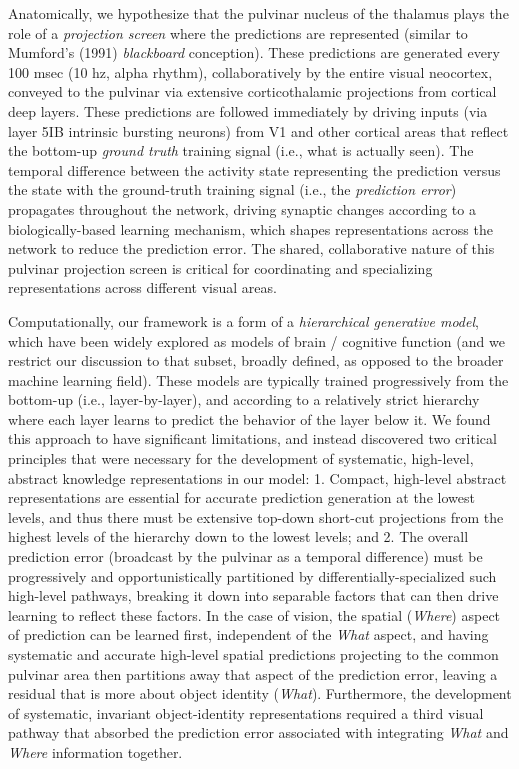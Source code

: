 \documentclass[11pt,twoside]{article}
\newif\myifpdf
\begin{document}
Anatomically, we hypothesize that the pulvinar nucleus of the thalamus plays the role of a {\em projection screen} where the predictions are represented (similar to Mumford's (1991) {\em blackboard} conception).  These predictions are generated every 100 msec (10 hz, alpha rhythm), collaboratively by the entire visual neocortex, conveyed to the pulvinar via extensive corticothalamic projections from cortical deep layers.  These predictions are followed immediately by driving inputs (via layer 5IB intrinsic bursting neurons) from V1 and other cortical areas that reflect the bottom-up {\em ground truth} training signal (i.e., what is actually seen).  The temporal difference between the activity state representing the prediction versus the state with the ground-truth training signal (i.e., the {\em prediction error}) propagates throughout the network, driving synaptic changes according to a biologically-based learning mechanism, which shapes representations across the network to reduce the prediction error.  The shared, collaborative nature of this pulvinar projection screen is critical for coordinating and specializing representations across different visual areas.

Computationally, our framework is a form of a {\em hierarchical generative model}, which have been widely explored as models of brain / cognitive function (and we restrict our discussion to that subset, broadly defined, as opposed to the broader machine learning field).  These models are typically trained progressively from the bottom-up (i.e., layer-by-layer), and according to a relatively strict hierarchy where each layer learns to predict the behavior of the layer below it.  We found this approach to have significant limitations, and instead discovered two critical principles that were necessary for the development of systematic, high-level, abstract knowledge representations in our model: 1. Compact, high-level abstract representations are essential for accurate prediction generation at the lowest levels, and thus there must be extensive top-down short-cut projections from the highest levels of the hierarchy down to the lowest levels; and 2. The overall prediction error (broadcast by the pulvinar as a temporal difference) must be progressively and opportunistically partitioned by differentially-specialized such high-level pathways, breaking it down into separable factors that can then drive learning to reflect these factors.  In the case of vision, the spatial ({\em Where}) aspect of prediction can be learned first, independent of the {\em What} aspect, and having systematic and accurate high-level spatial predictions projecting to the common pulvinar area then partitions away that aspect of the prediction error, leaving a residual that is more about object identity ({\em What}).  Furthermore, the development of systematic, invariant object-identity representations required a third visual pathway that absorbed the prediction error associated with integrating {\em What} and {\em Where} information together.
\end{document}
